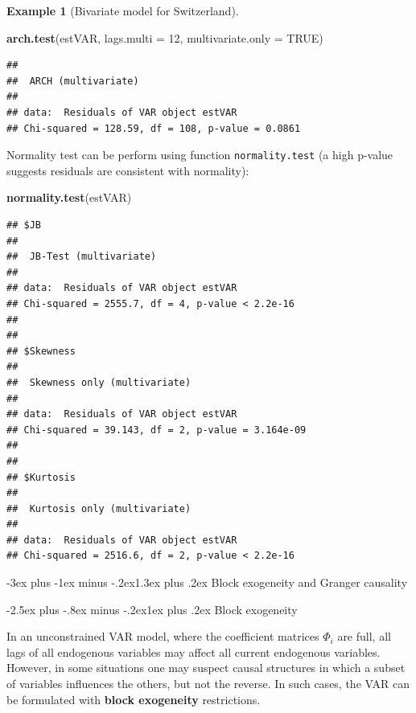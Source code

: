 \documentclass[
  11pt,
]{book}
\makeatletter
\newenvironment{Shaded}{\begin{snugshade}}{\end{snugshade}}
\newcommand{\AttributeTok}[1]{\textcolor[rgb]{0.13,0.29,0.53}{#1}}
\newcommand{\ConstantTok}[1]{\textcolor[rgb]{0.56,0.35,0.01}{#1}}
\newcommand{\DecValTok}[1]{\textcolor[rgb]{0.00,0.00,0.81}{#1}}
\newcommand{\FunctionTok}[1]{\textcolor[rgb]{0.13,0.29,0.53}{\textbf{#1}}}
\newcommand{\NormalTok}[1]{#1}
\renewcommand\section{\@startsection{section}{1}{\z@}
  {-3ex plus -1ex minus -.2ex}{1.3ex plus .2ex}
  {\normalfont\Large\bfseries\color{TextbookInk}}}
\renewcommand\subsection{\@startsection{subsection}{2}{\z@}
  {-2.5ex plus -.8ex minus -.2ex}{1ex plus .2ex}
  {\normalfont\large\bfseries\color{TextbookInk}}}
\theoremstyle{definition}
\theoremstyle{definition}
\newtheorem{example}{Example}[chapter]
\theoremstyle{definition}
\theoremstyle{definition}
\theoremstyle{remark}
\makeatother
\begin{document}
\begin{example}[Bivariate model for Switzerland]
\begin{Shaded}
\begin{Highlighting}[]
\FunctionTok{arch.test}\NormalTok{(estVAR, }\AttributeTok{lags.multi =} \DecValTok{12}\NormalTok{, }\AttributeTok{multivariate.only =} \ConstantTok{TRUE}\NormalTok{)}
\end{Highlighting}
\end{Shaded}

\begin{verbatim}
## 
##  ARCH (multivariate)
## 
## data:  Residuals of VAR object estVAR
## Chi-squared = 128.59, df = 108, p-value = 0.0861
\end{verbatim}

Normality test can be perform using function \texttt{normality.test} (a high p-value suggests residuals are consistent with normality):

\begin{Shaded}
\begin{Highlighting}[]
\FunctionTok{normality.test}\NormalTok{(estVAR)}
\end{Highlighting}
\end{Shaded}

\begin{verbatim}
## $JB
## 
##  JB-Test (multivariate)
## 
## data:  Residuals of VAR object estVAR
## Chi-squared = 2555.7, df = 4, p-value < 2.2e-16
## 
## 
## $Skewness
## 
##  Skewness only (multivariate)
## 
## data:  Residuals of VAR object estVAR
## Chi-squared = 39.143, df = 2, p-value = 3.164e-09
## 
## 
## $Kurtosis
## 
##  Kurtosis only (multivariate)
## 
## data:  Residuals of VAR object estVAR
## Chi-squared = 2516.6, df = 2, p-value < 2.2e-16
\end{verbatim}

\end{example}

\section{Block exogeneity and Granger causality}\label{BlockGranger}

\subsection{Block exogeneity}\label{block-exogeneity}

In an unconstrained VAR model, where the coefficient matrices \(\Phi_i\) are full, all lags of all endogenous variables may affect all current endogenous variables. However, in some situations one may suspect causal structures in which a subset of variables influences the others, but not the reverse. In such cases, the VAR can be formulated with \textbf{block exogeneity} restrictions.
\end{document}
